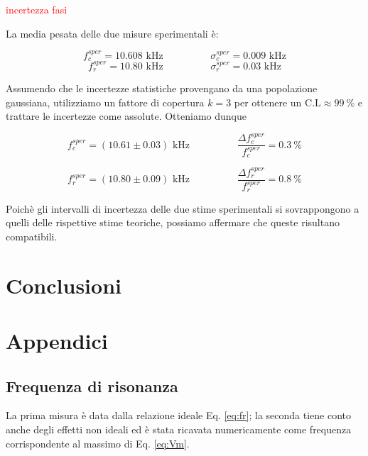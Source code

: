 \documentclass[12pt,italian]{article}
\newcommand{\err}[1]{\textcolor{red}{#1}}
\begin{document}
\err{incertezza fasi}

La media pesata delle due misure sperimentali è:

\begin{equation*}
	f_{c}^{sper} = 10.608 \text{ kHz}  \hspace{2cm}  \sigma_c^{sper} = 0.009 \text{ kHz}
\end{equation*}
\begin{equation*}
	f_{r}^{sper} = 10.80 \text{ kHz}  \hspace{2cm}  \sigma_r^{sper} = 0.03  \text{ kHz}
\end{equation*}

Assumendo che le incertezze statistiche provengano da una popolazione
gaussiana, utilizziamo un fattore di copertura $k = 3$ per ottenere un
$\text{C.L}\approx 99 \ \% $ e trattare le incertezze come assolute. Otteniamo
dunque

\begin{equation*}
	f_{c}^{sper} = (10.61 \pm 0.03) \text{ kHz} \hspace{2cm} \frac{\Delta f_{c}^{sper}}{f_{c}^{sper}} = 0.3 \ \%
\end{equation*}

\begin{equation*}
	f_{r}^{sper} = (10.80 \pm 0.09) \text{ kHz} \hspace{2cm} \frac{\Delta f_{r}^{sper}}{f_{r}^{sper}} = 0.8 \ \%
\end{equation*}

Poichè gli intervalli di incertezza delle due stime sperimentali si
sovrappongono a quelli delle rispettive stime teoriche, possiamo affermare che
queste risultano compatibili.

\section*{Conclusioni}

\appendix
\section{Appendici}
\subsection{Frequenza di risonanza}\label{sec:resFreq}
La prima misura è data dalla relazione ideale Eq. \eqref{eq:fr}; la seconda
tiene conto anche degli effetti non ideali ed è stata ricavata numericamente
come frequenza corrispondente al massimo di Eq. \eqref{eq:Vm}.
\end{document}
